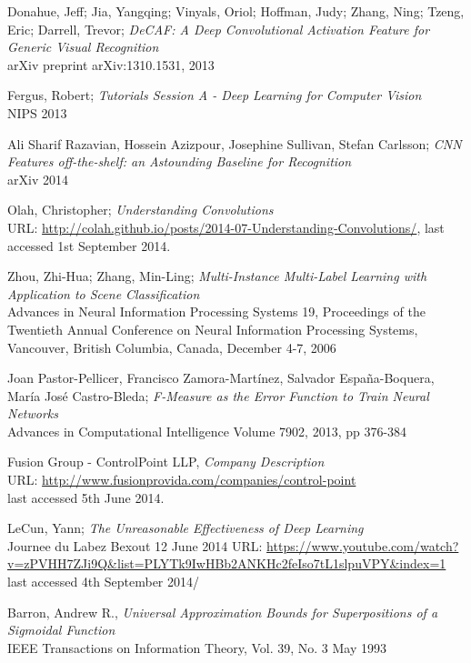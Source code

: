 \documentclass[a4paper,11pt]{article}
\begin{document}
\begin{thebibliography}{1}
 Donahue, Jeff; Jia, Yangqing; Vinyals, Oriol; Hoffman, Judy; Zhang, Ning; Tzeng, Eric; Darrell, Trevor;
  \emph{DeCAF: A Deep Convolutional Activation Feature for Generic Visual Recognition}\\
  arXiv preprint arXiv:1310.1531, 2013
  
 Fergus, Robert;
 \emph{Tutorials Session A - Deep Learning for Computer Vision}\\
 NIPS 2013  
  
 Ali Sharif Razavian, Hossein Azizpour, Josephine Sullivan, Stefan Carlsson;
 \emph{CNN Features off-the-shelf: an Astounding Baseline for Recognition}\\
 arXiv 2014
 
 Olah, Christopher;
 \emph{Understanding Convolutions}\\
 URL: \url{http://colah.github.io/posts/2014-07-Understanding-Convolutions/}, last accessed 1st September 2014.

 Zhou, Zhi-Hua; Zhang, Min-Ling;
  \emph{Multi-Instance Multi-Label Learning with Application to Scene Classification}\\
  Advances in Neural Information Processing Systems 19, 
  Proceedings of the Twentieth Annual Conference on Neural Information Processing Systems, 
  Vancouver, British Columbia, Canada, 
  December 4-7, 2006

 Joan Pastor-Pellicer, Francisco Zamora-Martínez, Salvador España-Boquera, María José Castro-Bleda;
 \emph{F-Measure as the Error Function to Train Neural Networks}\\
 Advances in Computational Intelligence
 Volume 7902, 2013, pp 376-384

 Fusion Group - ControlPoint LLP,
 \emph{Company Description}\\
 URL: \url{http://www.fusionprovida.com/companies/control-point}\\ last accessed 5th June 2014. 
  
 LeCun, Yann;
 \emph{The Unreasonable Effectiveness of Deep Learning}\\
 Journee du Labez Bexout
 12 June 2014  
 URL: \url{https://www.youtube.com/watch?v=zPVHH7ZJi9Q&list=PLYTk9IwHBb2ANKHc2feIso7tL1slpuVPY&index=1}\\ last accessed 4th September 2014/
  
 Barron, Andrew R.,
 \emph{Universal Approximation Bounds for Superpositions of a Sigmoidal Function}\\
 IEEE Transactions on Information Theory, 
 Vol. 39, No. 3
 May 1993


\end{thebibliography}
\end{document}

